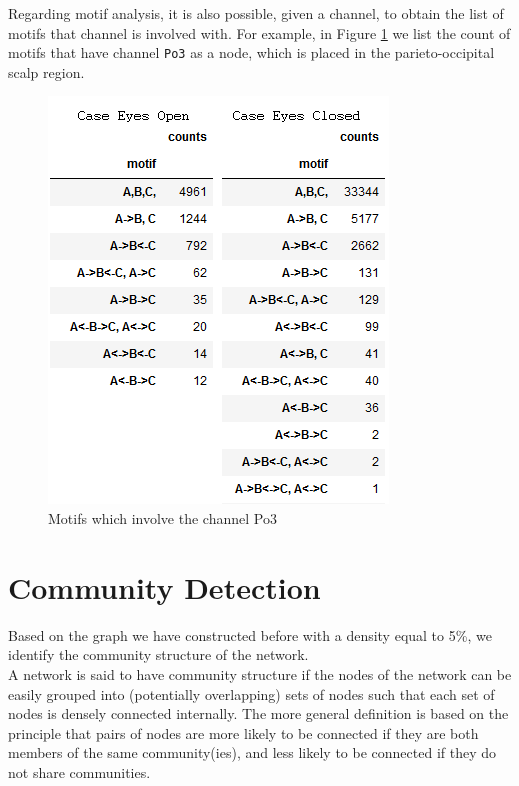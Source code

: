 \documentclass[%
 aip,
 jmp,%
 amsmath,amssymb,
 reprint,%
]{revtex4-1}
\begin{document}
Regarding motif analysis, it is also possible, given a channel, to obtain the list of motifs that channel is involved with. For example, in Figure \ref{fig:motifgivenchannelpo3} we list the count of motifs that have channel \verb|Po3| as a node, which is placed in the parieto-occipital scalp region.

\begin{figure}
	\centering
	\includegraphics[width=0.7\linewidth]{../motif_given_channel_Po3}
	\caption{Motifs which involve the channel Po3 }
	\label{fig:motifgivenchannelpo3}
\end{figure}


\section{\label{sec:level1}Community Detection}

Based on the graph we have constructed before with a density equal to 5\%, we identify the community structure of the network.\\

A network is said to have community structure if the nodes of the network can be easily grouped into (potentially overlapping) sets of nodes such that each set of nodes is densely connected internally. The more general definition is based on the principle that pairs of nodes are more likely to be connected if they are both members of the same community(ies), and less likely to be connected if they do not share communities. \\
\end{document}

